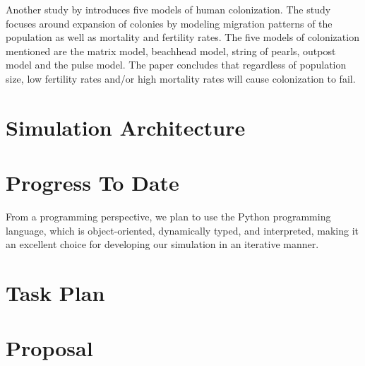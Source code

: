 \documentclass[12pt]{article}
\begin{document}
Another study by \cite{moore2001evaluating} introduces five models of human
colonization.  The study focuses around expansion of colonies by modeling
migration patterns of the population as well as mortality and fertility rates.
The five models of colonization mentioned are the matrix model, beachhead
model, string of pearls, outpost model and the pulse model. The paper
concludes that regardless of population size, low fertility rates and/or high
mortality rates will cause colonization to fail.

\section{Simulation Architecture}
\label{sec:architecture}

\section{Progress To Date}
\label{sec:progress}

From a programming perspective, we plan to use the Python programming language,
which is object-oriented, dynamically typed, and interpreted, making it an
excellent choice for developing our simulation in an iterative manner.

\section{Task Plan}
\label{sec:taskplan}

\section{Proposal}
\label{sec:proposal}

\clearpage
{}

\end{document}
